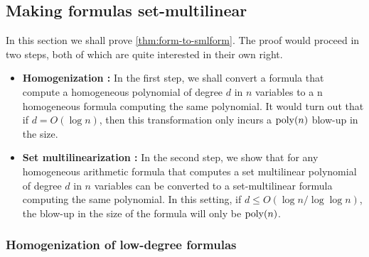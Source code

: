 \subsection{Making formulas set-multilinear}

In this section we shall prove \autoref{thm:form-to-smlform}.
The proof would proceed in two steps, both of which are quite interested in their own right.
\begin{itemize}
\setlength\itemsep{0em}
\item {\bf Homogenization :} In the first step, we shall convert a
  formula that compute a homogeneous polynomial of degree $d$ in $n$ variables to a n homogeneous formula computing the same polynomial.
It would turn out that if $d = O(\log n)$, then this transformation only incurs a $\operatorname{poly}(n)$ blow-up in the size.
\item {\bf Set multilinearization :} In the second step, we show that
  for any homogeneous arithmetic formula that computes a set multilinear polynomial of degree $d$ in $n$ variables can be converted to a set-multilinear formula computing the same polynomial.
In this setting, if $d \leq O(\log n/\log \log n)$, the blow-up in the size of the formula will only be $\operatorname{poly}(n)$.
\end{itemize}

\subsubsection*{Homogenization of low-degree formulas}

